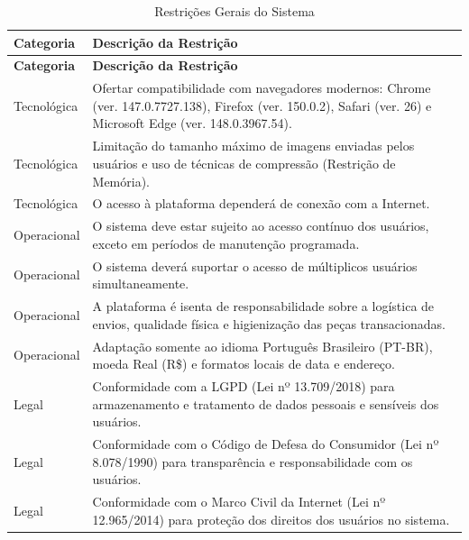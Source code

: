 ﻿\documentclass[12pt,a4paper]{article}
\begin{document}
\begin{longtable}{|l|p{9.5cm}|}

\caption{Restrições Gerais do Sistema} \\

\hline
\cellcolor{gray!30} \textbf{Categoria} &
\cellcolor{gray!30} \textbf{Descrição da Restrição} \\
\hline
\endfirsthead

\hline
\cellcolor{gray!30} \textbf{Categoria} &
\cellcolor{gray!30} \textbf{Descrição da Restrição} \\
\hline
\endhead

Tecnológica & Ofertar compatibilidade com navegadores modernos: Chrome (ver. 147.0.7727.138), Firefox (ver. 150.0.2), Safari (ver. 26) e Microsoft Edge (ver. 148.0.3967.54). \\
\hline

Tecnológica & Limitação do tamanho máximo de imagens enviadas pelos usuários e uso de técnicas de compressão (Restrição de Memória). \\
\hline

Tecnológica & O acesso à plataforma dependerá de conexão com a Internet. \\
\hline

Operacional & O sistema deve estar sujeito ao acesso contínuo dos usuários, exceto em períodos de manutenção programada. \\
\hline

Operacional & O sistema deverá suportar o acesso de múltiplicos usuários simultaneamente. \\
\hline

Operacional & A plataforma é isenta de responsabilidade sobre a logística de envios, qualidade física e higienização das peças transacionadas. \\
\hline

Operacional & Adaptação somente ao idioma Português Brasileiro (PT-BR), moeda Real (R\$) e formatos locais de data e endereço. \\
\hline

Legal & Conformidade com a LGPD (Lei nº 13.709/2018) para armazenamento e tratamento de dados pessoais e sensíveis dos usuários. \\
\hline

Legal & Conformidade com o Código de Defesa do Consumidor (Lei nº 8.078/1990) para transparência e responsabilidade com os usuários. \\
\hline

Legal & Conformidade com o Marco Civil da Internet (Lei nº 12.965/2014) para proteção dos direitos dos usuários no sistema. \\
\hline


\end{longtable}
\end{document}
